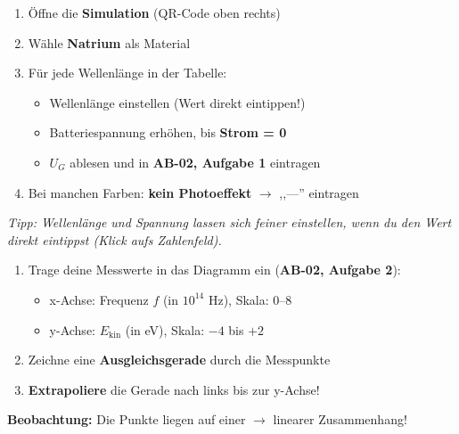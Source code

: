 \documentclass[11pt,a4paper]{article}
\begin{document}

\begin{tcolorbox}[schrittbox={Schritt 1: Messreihe aufnehmen (15 min)}]
\begin{enumerate}[nosep, leftmargin=*]
\item Öffne die \textbf{Simulation} (QR-Code oben rechts)
\item Wähle \textbf{Natrium} als Material
\item Für jede Wellenlänge in der Tabelle:
    \begin{itemize}[nosep]
    \item Wellenlänge einstellen (Wert direkt eintippen!)
    \item Batteriespannung erhöhen, bis \textbf{Strom = 0}
    \item $U_G$ ablesen und in \textbf{AB-02, Aufgabe 1} eintragen
    \end{itemize}
\item Bei manchen Farben: \textbf{kein Photoeffekt} $\rightarrow$ ,,---'' eintragen
\end{enumerate}

\vspace{0.3em}
\textit{Tipp: Wellenlänge und Spannung lassen sich feiner einstellen, wenn du den Wert direkt eintippst (Klick aufs Zahlenfeld).}
\end{tcolorbox}


\begin{tcolorbox}[schrittbox={Schritt 2: Einsteinsche Gerade zeichnen (15 min)}]
\begin{enumerate}[nosep, leftmargin=*]
\item Trage deine Messwerte in das Diagramm ein (\textbf{AB-02, Aufgabe 2}):
    \begin{itemize}[nosep]
    \item x-Achse: Frequenz $f$ (in $10^{14}$ Hz), Skala: 0--8
    \item y-Achse: $E_{\text{kin}}$ (in eV), Skala: $-4$ bis $+2$
    \end{itemize}
\item Zeichne eine \textbf{Ausgleichsgerade} durch die Messpunkte
\item \textbf{Extrapoliere} die Gerade nach links bis zur y-Achse!
\end{enumerate}

\vspace{0.3em}
\textbf{Beobachtung:} Die Punkte liegen auf einer \underline{\hspace{2.5cm}} $\rightarrow$ linearer Zusammenhang!
\end{tcolorbox}
\end{document}
